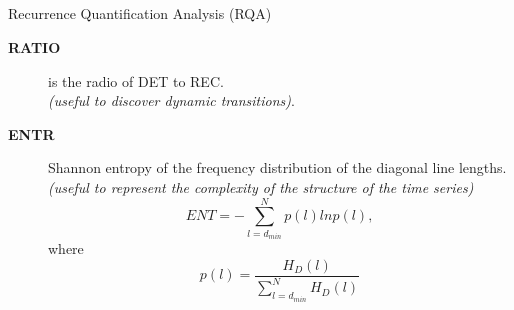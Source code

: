\subsection{}
{

\begin{frame}{Recurrence Quantification Analysis (RQA)}

\begin{description}
\item [ \textbf{RATIO} ] is the radio of DET to REC. \\
			\textit{(useful to discover dynamic transitions)}.
\item [ \textbf{ENTR} ] Shannon entropy of the frequency distribution of the 
			diagonal line lengths.
			\textit{(useful to represent the complexity of the 
				structure of the time series)}
\begin{equation*}
	ENT= - \sum^{N}_{l=d_{min}} p(l) ln p(l),
\end{equation*}
where 
\begin{equation*}
	p(l)=\frac{ H_D(l) }{ \sum^{N}_{ l=d_{min} } H_D(l) }
\end{equation*}

\end{description}


	
\end{frame}
}






